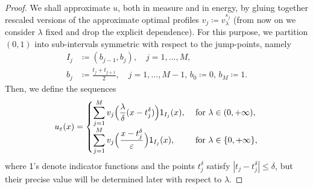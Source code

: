 \documentclass{article}
\theoremstyle{definition}
\newcommand{\e}{\varepsilon}
\newcommand{\del}{\delta}
\def\e{\varepsilon}
\begin{document}
\begin{proof}
   We shall approximate $u$, both in measure and in energy, by gluing together rescaled versions of the approximate optimal profiles $v_j\coloneqq v^{s_j}_\lambda$ (from now on we consider $\lambda$ fixed and drop the explicit dependence).  For this purpose, we partition $(0,1)$ into sub-intervals symmetric with respect to the jump-points, namely
    \begin{align*}
        I_j &\coloneqq  (b_{j-1}, b_j), \quad j=1,\ldots, M, \\
        b_j &\coloneqq \frac{t_j+t_{j+1}}{2}, \quad j=1,\ldots, M-1, \,b_0\coloneqq 0, \,
        b_{M}\coloneqq 1.
    \end{align*}
     Then, we define the sequences
    \begin{equation}
        \label{eq:recovery_sequence}
        u_\e(x) = \begin{cases}
            \displaystyle\sum_{j=1}^M v_{j}\Big( \frac{\lambda}{ \del}(x-t_j^\delta) \Big)\mathsf{1}_{I_j}(x), &\text{ for }\lambda\in (0,+\infty),\\
            \displaystyle\sum_{j=1}^M v_{j}\Big(\mkern1mu\frac{x-t_j^\delta}{ \e} \mkern1mu\Big)\mathsf{1}_{I_j}(x), &\text{ for }\lambda\in \{0,+\infty\},\\
        \end{cases}
    \end{equation}
    where $\mathsf{1}$'s denote indicator functions and the points $t^\delta_j$ satisfy $|t_j-t_j^\delta|\le\del$, but their precise value will be determined later with respect to $\lambda$.
    

\end{proof}
\end{document}
